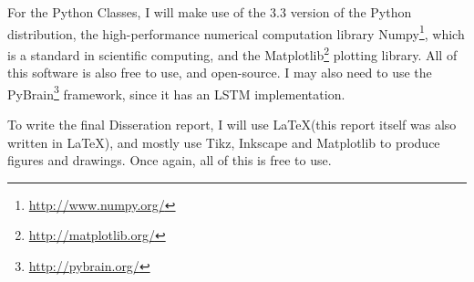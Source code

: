 For the Python Classes, I will make use of the 3.3 version of the Python distribution, the high-performance numerical computation library Numpy\footnote{\href{http://www.numpy.org/}{http://www.numpy.org/}}, which is a standard in scientific computing, and the Matplotlib\footnote{\href{http://matplotlib.org/}{http://matplotlib.org/}} plotting library. All of this software is also free to use, and open-source. I may also need to use the PyBrain\footnote{\href{http://pybrain.org/}{http://pybrain.org/}} framework, since it has an LSTM implementation. 

To write the final Disseration report, I will use \LaTeX (this report itself was also written in \LaTeX), and mostly use Tikz, Inkscape and Matplotlib to produce figures and drawings. Once again, all of this is free to use.
